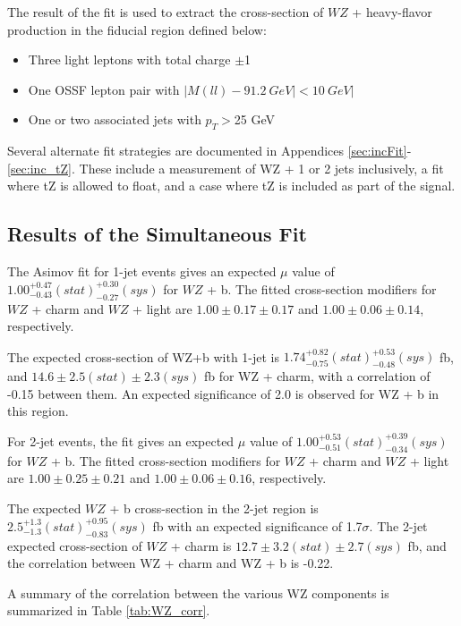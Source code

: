 The result of the fit is used to extract the cross-section of $WZ$ + heavy-flavor production in the fiducial region defined below:

\begin{itemize}
\item Three light leptons with total charge $\pm$1
\item One OSSF lepton pair with $|M(ll)-91.2\ GeV| < 10\ GeV|$
\item One or two associated jets with $p_T >$25 GeV
\end{itemize}

Several alternate fit strategies are documented in Appendices \ref{sec:incFit}-\ref{sec:inc_tZ}. These include a measurement of WZ + 1 or 2 jets inclusively, a fit where tZ is allowed to float, and a case where tZ is included as part of the signal.

\subsection{Results of the Simultaneous Fit}
\label{sec:resSum}

The Asimov fit for 1-jet events gives an expected $\mu$ value of $1.00^{+0.47}_{-0.43}(stat)^{+0.30}_{-0.27}(sys)$ for $WZ$ + b. The fitted cross-section modifiers for $WZ$ + charm and $WZ$ + light are $1.00 \pm 0.17 \pm 0.17$ and $1.00 \pm 0.06 \pm 0.14 $, respectively.

The expected cross-section of WZ+b with 1-jet is $1.74^{+0.82}_{-0.75}(stat)^{+0.53}_{-0.48}(sys)$ fb, and $14.6 \pm 2.5 (stat) \pm 2.3 (sys)$ fb for WZ + charm, with a correlation of -0.15 between them. An expected significance of 2.0 is observed for WZ + b in this region. 

For 2-jet events, the fit gives an expected $\mu$ value of $1.00^{+0.53}_{-0.51}(stat)^{+0.39}_{-0.34}(sys)$ for $WZ$ + b. The fitted cross-section modifiers for $WZ$ + charm and $WZ$ + light are $1.00 \pm 0.25 \pm 0.21$ and $1.00 \pm 0.06 \pm 0.16 $, respectively.

The expected $WZ$ + b cross-section in the 2-jet region is $2.5^{+1.3}_{-1.3}(stat)^{+0.95}_{-0.83}(sys)$ fb with an expected significance of 1.7$\sigma$. The 2-jet expected cross-section of $WZ$ + charm is $12.7 \pm 3.2 (stat) \pm 2.7 (sys)$ fb, and the correlation between WZ + charm and WZ + b is -0.22. 

A summary of the correlation between the various WZ components is summarized in Table \ref{tab:WZ_corr}.

